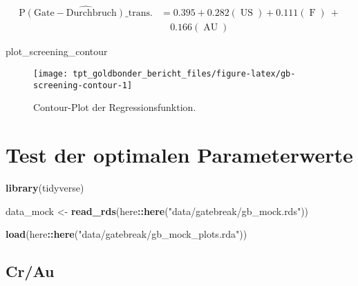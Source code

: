 \documentclass[
  paper=a4,
  ,captions=tableheading
]{scrartcl}
\newenvironment{Shaded}{\begin{snugshade}}{\end{snugshade}}
\newcommand{\KeywordTok}[1]{\textcolor[rgb]{0.13,0.29,0.53}{\textbf{#1}}}
\newcommand{\NormalTok}[1]{#1}
\newcommand{\OperatorTok}[1]{\textcolor[rgb]{0.81,0.36,0.00}{\textbf{#1}}}
\newcommand{\StringTok}[1]{\textcolor[rgb]{0.31,0.60,0.02}{#1}}
\begin{document}
\begin{equation}
\begin{aligned}
\operatorname{\widehat{P(Gate-Durchbruch)\_trans.}} &= 0.395 + 0.282(\operatorname{US}) + 0.111(\operatorname{F})\ + \\
&\quad 0.166(\operatorname{AU})
\end{aligned}
\end{equation}

\begin{Shaded}
\begin{Highlighting}[]
\NormalTok{plot_screening_contour}
\end{Highlighting}
\end{Shaded}

\begin{figure}

{\centering \texttt{[image: tpt\_goldbonder\_bericht\_files/figure-latex/gb-screening-contour-1]} 

}

\caption{Contour-Plot der Regressionsfunktion.}\label{fig:gb-screening-contour}
\end{figure}

\hypertarget{gb-mock}{%
\section{Test der optimalen Parameterwerte}\label{gb-mock}}

\begin{Shaded}
\begin{Highlighting}[]
\KeywordTok{library}\NormalTok{(tidyverse)}
\end{Highlighting}
\end{Shaded}

\begin{Shaded}
\begin{Highlighting}[]
\NormalTok{data_mock <-}\StringTok{ }
\StringTok{  }\KeywordTok{read_rds}\NormalTok{(here}\OperatorTok{::}\KeywordTok{here}\NormalTok{(}\StringTok{"data/gatebreak/gb_mock.rds"}\NormalTok{))}

\KeywordTok{load}\NormalTok{(here}\OperatorTok{::}\KeywordTok{here}\NormalTok{(}\StringTok{"data/gatebreak/gb_mock_plots.rda"}\NormalTok{))}
\end{Highlighting}
\end{Shaded}

\hypertarget{crau}{%
\subsection{Cr/Au}\label{crau}}
\end{document}
